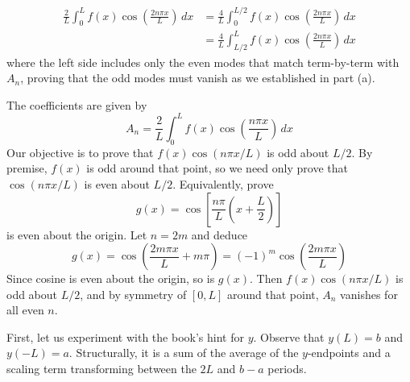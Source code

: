 \documentclass[a4paper]{article}
\begin{document}
\begin{enumerate}[label=(\alph*)]
	\begin{align*}
		\frac{2}{L}\int^{L}_{0} f \!\left( x \right)\cos\!\left(\frac{2n \pi x}{L}\right) \, dx & = \frac{4}{L}\int^{L/2}_{0} f \!\left( x \right)\cos\!\left(\frac{2n \pi x}{L}\right) \, dx \\
													& = \frac{4}{L}\int^{L}_{L/2} f \!\left( x \right)\cos\!\left(\frac{2n \pi x}{L}\right) \, dx    
	\end{align*}
	where the left side includes only the even modes that match term-by-term with \( A_{n} \), proving that the odd modes must vanish as we established in part (a).
\end{enumerate}


The coefficients are given by
\[
	A_{n} = \frac{2}{L}\int^{L}_{0} f \!\left( x \right)\cos\!\left(\frac{n \pi x}{L}\right) \, dx 
\]
Our objective is to prove that \( f \!\left( x \right)\cos\!\left(n \pi x / L\right) \) is odd about \( L/2 \). By premise, \( f \!\left( x \right) \) is odd around that point, so we need only prove that \( \cos\!\left(n \pi x / L\right) \) is even about \( L/2 \). Equivalently, prove
\[
	g \!\left( x \right) = \cos\!\left[\frac{n \pi}{L}\!\left( x + \frac{L}{2} \right)\right]
\]
is even about the origin. Let \( n = 2m \) and deduce
\[
	g \!\left( x \right) = \cos\!\left(\frac{2m \pi x}{L} + m \pi \right) = \!\left( -1 \right)^{m}\cos\!\left(\frac{2m \pi x}{L}\right)
\]
Since cosine is even about the origin, so is \( g \!\left( x \right) \). Then \( f \!\left( x \right)\cos\!\left(n \pi x / L\right) \) is odd about \( L/2 \), and by symmetry of \( \!\left[ 0,L \right] \) around that point, \( A_{n} \) vanishes for all even \( n \).

\vspace{12pt}


First, let us experiment with the book's hint for \( y \). Observe that \( y \!\left( L \right) = b \) and \( y \!\left( -L \right) = a \). Structurally, it is a sum of the average of the \( y \)-endpoints and a scaling term transforming between the \( 2L \) and \( b - a \) periods.
\end{document}
